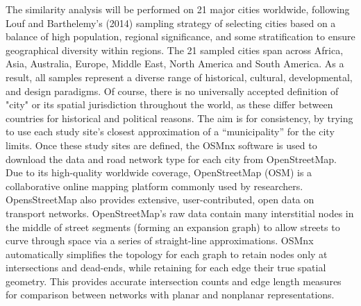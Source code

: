 The similarity analysis will be performed on 21 major cities worldwide, following Louf and Barthelemy's (2014) sampling strategy of selecting cities based on a balance of high population, regional significance, and some stratification to ensure geographical diversity within regions. The 21 sampled cities span across Africa, Asia, Australia, Europe, Middle East, North America and South America. As a result, all samples represent a diverse range of historical, cultural, developmental, and design paradigms. Of course, there is no universally accepted definition of "city" or its spatial jurisdiction throughout the world, as these differ between countries for historical and political reasons. The aim is for consistency, by trying to use each study site’s closest approximation of a “municipality” for the city limits. Once these study sites are defined,  the OSMnx software is used to download the data and road network type for each city from OpenStreetMap. Due to its high-quality worldwide coverage, OpenStreetMap (OSM) is a collaborative online mapping platform commonly used by researchers. OpensStreetMap also provides extensive, user-contributed, open data on transport networks. OpenStreetMap’s raw data contain many interstitial nodes in the middle of street segments (forming an expansion graph) to allow streets to curve through space via a series of straight-line approximations. OSMnx automatically simplifies the topology for each graph to retain nodes only at intersections and dead-ends, while retaining for each edge their true spatial geometry. This provides accurate intersection counts and edge length measures for comparison between  networks with planar and nonplanar representations.

